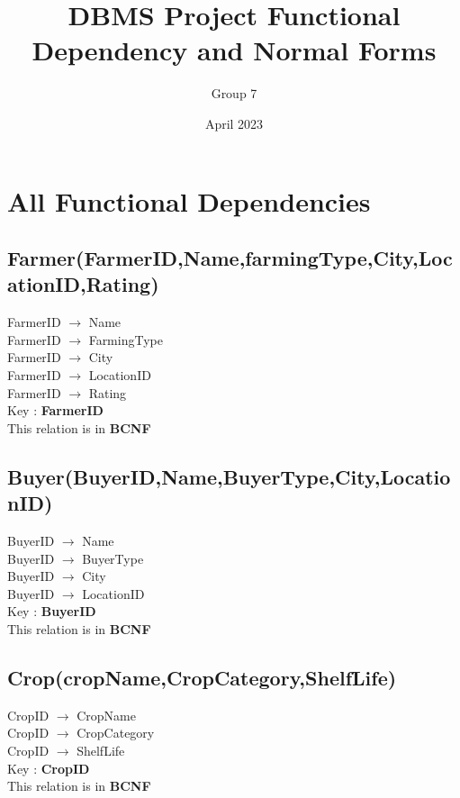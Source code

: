 \documentclass{article}
\title{DBMS Project Functional Dependency and Normal Forms}
\author{Group 7}
\date{April 2023}
\begin{document}
\maketitle

\section*{All Functional Dependencies}

\subsection*{Farmer(FarmerID,Name,farmingType,City,LocationID,Rating)}
FarmerID $\longrightarrow$  Name            \\
FarmerID $\longrightarrow$  FarmingType     \\
FarmerID $\longrightarrow$  City            \\
FarmerID $\longrightarrow$  LocationID      \\
FarmerID $\longrightarrow$  Rating          \\

Key : \textbf{FarmerID}\\
This relation is in \textbf{BCNF}

\subsection*{Buyer(BuyerID,Name,BuyerType,City,LocationID)}
BuyerID $\longrightarrow$  Name            \\
BuyerID $\longrightarrow$  BuyerType            \\
BuyerID $\longrightarrow$  City            \\
BuyerID $\longrightarrow$  LocationID           \\

Key : \textbf{BuyerID}\\
This relation is in \textbf{BCNF}


\subsection*{Crop(cropName,CropCategory,ShelfLife)}
CropID $\longrightarrow$  CropName            \\
CropID $\longrightarrow$  CropCategory            \\
CropID $\longrightarrow$  ShelfLife     \\

Key : \textbf{CropID}\\
This relation is in \textbf{BCNF}
\end{document}
